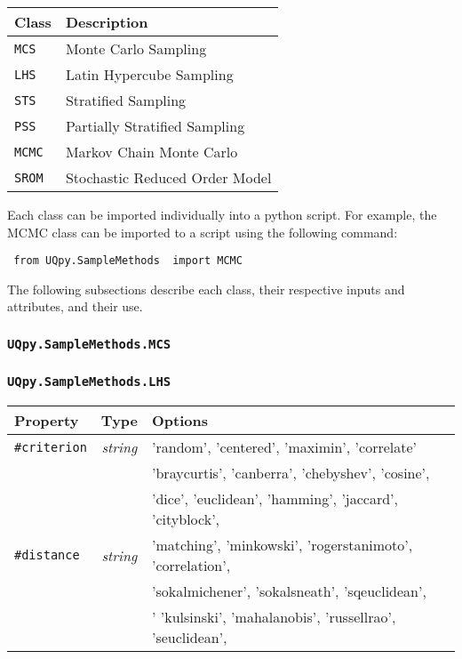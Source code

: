 \documentclass[./UsersGuide.tex]{subfiles}
\begin{document}
\vspace{4mm}
\begin{center}
	\begin{tabular}{ |l|l| } 
		\hline
		\textbf{Class} &  \textbf{Description} \\
		\hline
		\texttt{MCS}&  Monte Carlo Sampling  \\ 
		\hline
		\texttt{LHS}&  Latin Hypercube Sampling  \\ 
		\hline
		\texttt{STS}&  Stratified Sampling  \\ 
		\hline
		\texttt{PSS}&  Partially Stratified Sampling  \\ 
		\hline
		\texttt{MCMC}&  Markov Chain Monte Carlo  \\ 
		\hline
		\texttt{SROM}&  Stochastic Reduced Order Model  \\ 
		\hline
	\end{tabular}
\end{center}
\vspace{4mm}

\noindent
Each class can be imported individually into a python script. For example, the MCMC class can be imported to a script using the following command:

\vspace{4mm}
\texttt{{\color{blue} from} \texttt{UQpy.SampleMethods} {\color{blue} import} MCMC}
\vspace{4mm}

\noindent
The following subsections describe each class, their respective inputs and attributes, and their use.

\subsubsection{\texttt{UQpy.SampleMethods.MCS}}

\subsubsection{\texttt{UQpy.SampleMethods.LHS}}

\begin{center}
	\begin{tabular}{ |l|c|l| } 
		\hline
		\textbf{Property} & \textbf{Type} & \textbf{Options} \\
		\hline
		\texttt{\#criterion}& \textit{string} &  'random', 'centered', 'maximin', 'correlate'  \\ 
		\hline
		\multirow{5}{*}{\texttt{\#distance}} & \multirow{5}{*}{\textit{string}} & 'braycurtis', 'canberra', 'chebyshev', 'cosine', \\ 
		&  &  'dice', 'euclidean', 'hamming', 'jaccard',  'cityblock',   \\ 
		&  &  'matching', 'minkowski', 'rogerstanimoto',  'correlation', \\ 
		&  & 'sokalmichener', 'sokalsneath', 'sqeuclidean',  \\ 
		&  & ' 'kulsinski', 'mahalanobis', 'russellrao', 'seuclidean',  \\ 
		\hline
	\end{tabular}
\end{center}
\end{document}
